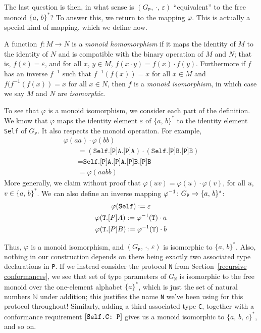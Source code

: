 \documentclass[../generics]{subfiles}
\begin{document}
The last question is then, in what sense is $(G_\texttt{P},\,\cdot,\,\varepsilon)$ ``equivalent'' to the free monoid $\{a,\,b\}^*$? To answer this, we return to the mapping $\varphi$. This is actually a special kind of mapping, which we define now.

\begin{definition}
%
%
%
%
A function $f\colon M\rightarrow N$ is a \emph{monoid homomorphism} if it maps the identity of $M$ to the identity of $N$ and is compatible with the binary operation of $M$ and $N$; that is, $f(\varepsilon)=\varepsilon$, and for all $x$, $y\in M$, $f(x\cdot y)=f(x)\cdot f(y)$. Furthermore if $f$ has an inverse $f^{-1}$ such that $f^{-1}(f(x))=x$ for all $x\in M$ and $f(f^{-1}(f(x))=x$ for all $x\in N$, then $f$ is a \emph{monoid isomorphism}, in which case we say $M$ and $N$ are \emph{isomorphic}.
\end{definition}

To see that $\varphi$ is a monoid isomorphism, we consider each part of the definition. We know that $\varphi$ maps the identity element $\varepsilon$ of $\{a,\,b\}^*$ to the identity element \texttt{Self} of $G_\texttt{P}$. It also respects the monoid operation. For example,
\begin{gather*}
\varphi(aa)\cdot\varphi(bb)\\
\qquad {}=(\texttt{Self.[P]A.[P]A})\cdot(\texttt{Self.[P]B.[P]B})\\
\qquad {}=\texttt{Self.[P]A.[P]A.[P]B.[P]B}\\
\qquad {}=\varphi(aabb)
\end{gather*}
More generally, we claim without proof that $\varphi(uv)=\varphi(u)\cdot\varphi(v)$, for all $u$, $v\in\{a,\,b\}^*$. We can also define an inverse mapping $\varphi^{-1}\colon G_\texttt{P}\rightarrow\{a,\,b\}^*$:
\begin{gather*}
\varphi(\texttt{Self}):=\varepsilon\\
\varphi(\texttt{T}.[P]A):=\varphi^{-1}(\texttt{T})\cdot a\\
\varphi(\texttt{T}.[P]B):=\varphi^{-1}(\texttt{T})\cdot b
\end{gather*}

Thus, $\varphi$ is a monoid isomorphism, and $(G_\texttt{P},\,\cdot,\,\varepsilon)$ is isomorphic to $\{a,\,b\}^*$. Also, nothing in our construction depends on there being exactly two associated type declarations in \texttt{P}. If we instead consider the protocol \texttt{N} from Section~\ref{recursive conformances}, we see that set of type parameters of $G_\texttt{N}$ is isomorphic to the free monoid over the one-element alphabet $\{a\}^*$, which is just the set of natural numbers $\mathbb{N}$ under addition; this justifies the name \texttt{N} we've been using for this protocol throughout! Similarly, adding a third associated type \texttt{C}, together with a conformance requirement $[\texttt{Self.C:~P}]$ gives us a monoid isomorphic to $\{a,\,b,\,c\}^*$, and so on.
\end{document}
